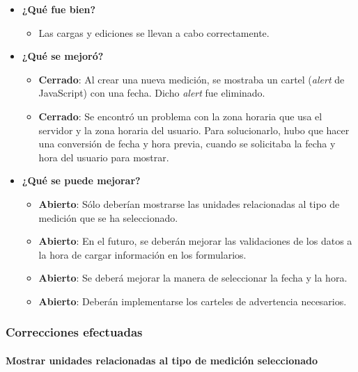 	\begin{itemize}
		\item \textbf{¿Qué fue bien?}
        	\begin{itemize}
				\item Las cargas y ediciones se llevan a cabo correctamente.
			\end{itemize}

   		\item \textbf{¿Qué se mejoró?}
        	\begin{itemize}
				\item \textbf{Cerrado}: Al crear una nueva medición, se mostraba un cartel (\textit{alert} de JavaScript) con una fecha. Dicho \textit{alert} fue eliminado.
                \item \textbf{Cerrado}: Se encontró un problema con la zona horaria que usa el servidor y la zona horaria del usuario. Para solucionarlo, hubo que hacer una conversión de fecha y hora previa, cuando se solicitaba la fecha y hora del usuario para mostrar.
			\end{itemize}

   		\item \textbf{¿Qué se puede mejorar?}
        	\begin{itemize}
		        \item \textbf{Abierto}: Sólo deberían mostrarse las unidades relacionadas al tipo de medición que se ha seleccionado.
				\item \textbf{Abierto}: En el futuro, se deberán mejorar las validaciones de los datos a la hora de cargar información en los formularios.
        		\item \textbf{Abierto}: Se deberá mejorar la manera de seleccionar la fecha y la hora. 
                \item \textbf{Abierto}: Deberán implementarse los carteles de advertencia necesarios.
            \end{itemize}
       
	\end{itemize}

\subsubsection{Correcciones efectuadas}

\paragraph{Mostrar unidades relacionadas al tipo de medición seleccionado}

